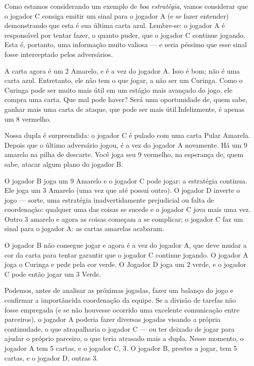 Como estamos considerando um exemplo de \emph{boa estratégia}, vamos considerar que o jogador C consiga emitir um sinal para o jogador A (e se fazer entender) demonstrando que esta é sua última carta azul. Lembre-se: o jogador A é responsável por tentar fazer, o quanto puder, que o jogador C continue jogando. Esta é, portanto, uma informação muito valiosa --- e seria péssimo que esse sinal fosse interceptado pelos adversários.

A carta agora é um 2 Amarelo, e é a vez do jogador A. Isso é bom; não é uma carta azul. Entretanto, ele não tem o que jogar, a não ser um Curinga. Como o Curinga pode ser muito mais útil em um estágio mais avançado do jogo, ele compra uma carta. Que mal pode haver? Será uma oportunidade de, quem sabe, ganhar mais uma carta de ataque, que pode ser mais útil.Infelizmente, é apenas um 8 vermelho.

Nossa dupla é surpreendida: o jogador C é pulado com uma carta Pular Amarela. Depois que o último adversário jogou, é a vez do jogador A novamente. Há um 9 amarelo na pilha de descarte. Você joga seu 9 vermelho, na esperança de, quem sabe, atacar algum plano do jogador B.

O jogador B joga um 9 Amarelo e o jogador C pode jogar: a estratégia continua. Ele joga um 3 Amarelo (uma vez que até possui outro). O jogador D inverte o jogo --- sorte, uma estratégia inadvertidamente prejudicial ou falta de coordenação: qualquer uma das coisas se sucede e o jogador C jova mais uma vez. Outro 3 amarelo e agora as coisas começam a se complicar; o jogador C faz um sinal para o jogador A: as cartas amarelas acabaram.

O jogador B não consegue jogar e agora é a vez do jogador A, que deve mudar a cor da carta para tentar garantir que o jogador C continue jogando. O jogador A joga o Curinga e pede pela cor verde. O Jogador D joga um 2 verde, e o jogador C pode então jogar um 3 Verde.

Podemos, antes de analisar as próximas jogadas, fazer um balanço do jogo e confirmar a importâncida coordenação da equipe. Se a divisão de tarefas não fosse empregada (e se não houvesse ocorrido uma excelente comunicação entre parceiros), o jogador A poderia fazer diversas jogadas visando a própria continudade, o que atrapalharia o jogador C --- ou ter deixado de jogar para ajudar o próprio parceiro, o que teria atrasado mais a dupla. Nesse momento, o jogador A tem 5 cartas, e o jogador C, 3. O jogador B, prestes a jogar, tem 5 cartas, e o jogador D, outras 3.

